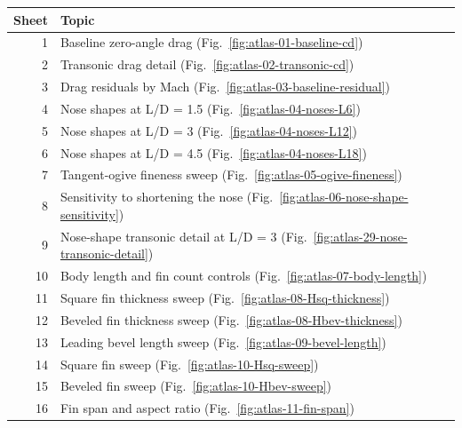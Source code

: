 \documentclass[oneside,openany]{amsdtx}
\begin{document}
{\small\begin{longtable}{@{}rL{.84\textwidth}@{}}\toprule Sheet & Topic\\\midrule\endhead

1 & Baseline zero-angle drag (Fig.~\ref{fig:atlas-01-baseline-cd})\\

2 & Transonic drag detail (Fig.~\ref{fig:atlas-02-transonic-cd})\\

3 & Drag residuals by Mach (Fig.~\ref{fig:atlas-03-baseline-residual})\\

4 & Nose shapes at L/D = 1.5 (Fig.~\ref{fig:atlas-04-noses-L6})\\

5 & Nose shapes at L/D = 3 (Fig.~\ref{fig:atlas-04-noses-L12})\\

6 & Nose shapes at L/D = 4.5 (Fig.~\ref{fig:atlas-04-noses-L18})\\

7 & Tangent-ogive fineness sweep (Fig.~\ref{fig:atlas-05-ogive-fineness})\\

8 & Sensitivity to shortening the nose (Fig.~\ref{fig:atlas-06-nose-shape-sensitivity})\\

9 & Nose-shape transonic detail at L/D = 3 (Fig.~\ref{fig:atlas-29-nose-transonic-detail})\\

10 & Body length and fin count controls (Fig.~\ref{fig:atlas-07-body-length})\\

11 & Square fin thickness sweep (Fig.~\ref{fig:atlas-08-Hsq-thickness})\\

12 & Beveled fin thickness sweep (Fig.~\ref{fig:atlas-08-Hbev-thickness})\\

13 & Leading bevel length sweep (Fig.~\ref{fig:atlas-09-bevel-length})\\

14 & Square fin sweep (Fig.~\ref{fig:atlas-10-Hsq-sweep})\\

15 & Beveled fin sweep (Fig.~\ref{fig:atlas-10-Hbev-sweep})\\

16 & Fin span and aspect ratio (Fig.~\ref{fig:atlas-11-fin-span})\\


\end{longtable}}
\end{document}
